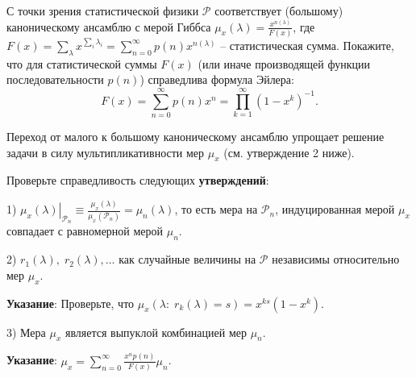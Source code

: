 \begin{problem}
\begin{ordre}
С точки зрения статистической физики $\mathcal P$ 
соответствует (большому) каноническому ансамблю с мерой Гиббса $\mu _x 
(\lambda )=\frac{x^{n(\lambda )}}{F(x)}$, где $F(x)=\sum\limits_\lambda 
{x^{\sum\limits_i {\lambda _i } }} =\sum\limits_{n=0}^\infty 
{p(n)x^{n(\lambda )}} $ -- статистическая сумма. Покажите, что для 
статистической суммы $F(x)$ (или иначе производящей функции последовательности $p(n)$) справедлива формула Эйлера: 
$$F(x)=\sum\limits_{n=0}^\infty {p(n)x^n} =\prod\limits_{k=1}^\infty 
{(1-x^k)^{-1}}.$$

Переход от малого к большому каноническому ансамблю упрощает решение задачи в силу  мультипликативности мер $\mu _x $ (см. утверждение 2 
ниже).

Проверьте справедливость следующих \textbf{утверждений}:

1) $\left. {\mu _x (\lambda )} \right|_{\mathcal P_n } \equiv \frac{\mu _x (\lambda 
)}{\mu _x (\mathcal P_n)}=\mu _n (\lambda )$, то есть мера на $\mathcal P_n $, индуцированная 
мерой $\mu _x $ совпадает с равномерной мерой $\mu _n $.

2) $r_1 (\lambda ),\;r_2 (\lambda ),\ldots$ как случайные величины на $\mathcal P$ 
независимы относительно мер $\mu _x $.

\textbf{Указание}: Проверьте, что $\mu _x \left( {\lambda :\;r_k (\lambda 
)=s} \right)=x^{ks}(1-x^k)$.

3) Мера $\mu _x $ является выпуклой комбинацией мер $\mu _n $.

\textbf{Указание}: $\mu _x =\sum\limits_{n=0}^\infty 
{\frac{x^np(n)}{F(x)}\mu _n } $.


\end{ordre}
\end{problem}
